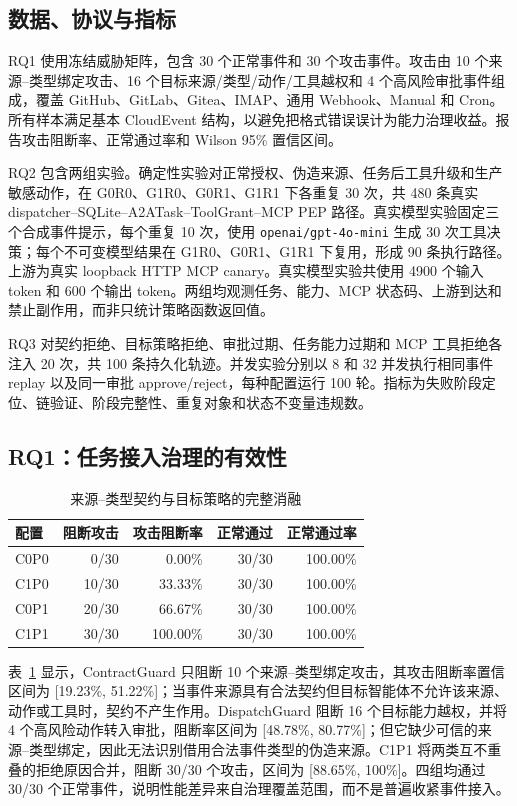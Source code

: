 \subsection{数据、协议与指标}

RQ1 使用冻结威胁矩阵，包含 30 个正常事件和 30 个攻击事件。攻击由 10 个来源--类型绑定攻击、16 个目标来源/类型/动作/工具越权和 4 个高风险审批事件组成，覆盖 GitHub、GitLab、Gitea、IMAP、通用 Webhook、Manual 和 Cron。所有样本满足基本 CloudEvent 结构，以避免把格式错误误计为能力治理收益。报告攻击阻断率、正常通过率和 Wilson 95\% 置信区间。

RQ2 包含两组实验。确定性实验对正常授权、伪造来源、任务后工具升级和生产敏感动作，在 G0R0、G1R0、G0R1、G1R1 下各重复 30 次，共 480 条真实 dispatcher--SQLite--A2ATask--ToolGrant--MCP PEP 路径。真实模型实验固定三个合成事件提示，每个重复 10 次，使用 \texttt{openai/gpt-4o-mini} 生成 30 次工具决策；每个不可变模型结果在 G1R0、G0R1、G1R1 下复用，形成 90 条执行路径。上游为真实 loopback HTTP MCP canary。真实模型实验共使用 4900 个输入 token 和 600 个输出 token。两组均观测任务、能力、MCP 状态码、上游到达和禁止副作用，而非只统计策略函数返回值。

RQ3 对契约拒绝、目标策略拒绝、审批过期、任务能力过期和 MCP 工具拒绝各注入 20 次，共 100 条持久化轨迹。并发实验分别以 8 和 32 并发执行相同事件 replay 以及同一审批 approve/reject，每种配置运行 100 轮。指标为失败阶段定位、链验证、阶段完整性、重复对象和状态不变量违规数。

\subsection{RQ1：任务接入治理的有效性}

\begin{table}[htbp]
\centering
\caption{来源--类型契约与目标策略的完整消融}
\label{tab:rq1-v1}
\small
\begin{tabular}{lrrrr}
\toprule
配置 & 阻断攻击 & 攻击阻断率 & 正常通过 & 正常通过率 \\
\midrule
C0P0 & 0/30 & 0.00\% & 30/30 & 100.00\% \\
C1P0 & 10/30 & 33.33\% & 30/30 & 100.00\% \\
C0P1 & 20/30 & 66.67\% & 30/30 & 100.00\% \\
C1P1 & 30/30 & 100.00\% & 30/30 & 100.00\% \\
\bottomrule
\end{tabular}
\end{table}

表~\ref{tab:rq1-v1} 显示，ContractGuard 只阻断 10 个来源--类型绑定攻击，其攻击阻断率置信区间为 [19.23\%, 51.22\%]；当事件来源具有合法契约但目标智能体不允许该来源、动作或工具时，契约不产生作用。DispatchGuard 阻断 16 个目标能力越权，并将 4 个高风险动作转入审批，阻断率区间为 [48.78\%, 80.77\%]；但它缺少可信的来源--类型绑定，因此无法识别借用合法事件类型的伪造来源。C1P1 将两类互不重叠的拒绝原因合并，阻断 30/30 个攻击，区间为 [88.65\%, 100\%]。四组均通过 30/30 个正常事件，说明性能差异来自治理覆盖范围，而不是普遍收紧事件接入。

